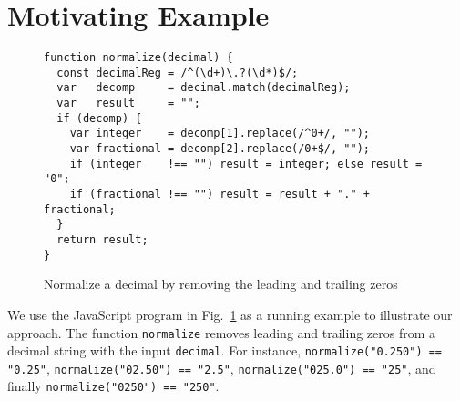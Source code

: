 
\section{Motivating Example}\label{sec:mot}

\begin{figure}[tb]
\begin{center}
\begin{verbatim}
function normalize(decimal) {
  const decimalReg = /^(\d+)\.?(\d*)$/;
  var   decomp     = decimal.match(decimalReg);
  var   result     = "";
  if (decomp) {
    var integer    = decomp[1].replace(/^0+/, "");
    var fractional = decomp[2].replace(/0+$/, "");
    if (integer    !== "") result = integer; else result = "0"; 
    if (fractional !== "") result = result + "." + fractional;
  }
  return result;
}
\end{verbatim}
\end{center}

\caption{Normalize a decimal by removing the leading and trailing zeros}
\label{fig-run-exmp}

\end{figure}

We use the JavaScript program in Fig.~\ref{fig-run-exmp} as a running example to
illustrate our approach. %
 The function {\tt normalize}   removes leading and trailing zeros from a decimal string with the input %
{\tt decimal}. For instance, 
 \texttt{normalize("0.250") == "0.25"},
 \texttt{normalize("02.50") == "2.5"},
 \texttt{normalize("025.0") == "25"},
and finally  \texttt{normalize("0250") == "250"}.



